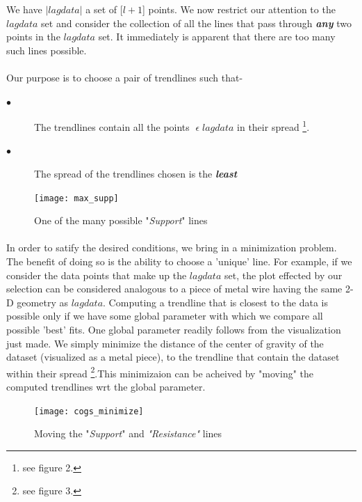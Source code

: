 \documentclass[letterpaper, 12pt] {article}
\begin{document}
	We have $|lagdata|$ a set of [$l+1$] points. We now restrict our attention to the $lagdata$ set and consider the collection of all the lines that pass through \textbf{\textit{any}} two points in the $lagdata$ set. It immediately is apparent that there are too many such lines possible. 
	\paragraph{}
	Our purpose is to choose a pair of trendlines such that-
	
	\begin{description}
		\item[$\bullet$] The trendlines contain all the points $\; \epsilon\; lagdata $ in their spread
		\footnote{see figure 2.}.
		\item[$\bullet$] The spread of the trendlines chosen is the \textbf{\textit{least}}
	\end{description}
	
	\begin{figure}[h!]
		\centering
		\texttt{[image: max\_supp]}
		\caption{One of the many possible "\textit{Support}" lines}
		\label{Figure 2}
	\end{figure}
	
	\paragraph{}
	In order to satify the desired conditions, we bring in a minimization problem. The benefit of doing so is the ability to choose a 'unique' line. For example, if we consider the data points that make up the $lagdata$ set, the plot effected by our selection can be considered analogous to a piece of metal wire having the same 2-D geometry as $lagdata$. Computing a trendline that is closest to the data is possible only if we have some global parameter with which we compare all possible 'best' fits. One global parameter readily follows from the visualization just made. We simply minimize the distance of the center of gravity of the dataset (visualized as a metal piece), to the trendline that contain the dataset within their spread \footnote{see figure 3.}.This minimizaion can be acheived by "moving" the computed trendlines wrt the global parameter.   
	
	\begin{figure}[h!]
		\centering
		\texttt{[image: cogs\_minimize]}
		\caption{Moving the "\textit{Support}" and \textit{"Resistance"} lines}
		\label{Figure 3}
	\end{figure}
	
\end{document}
